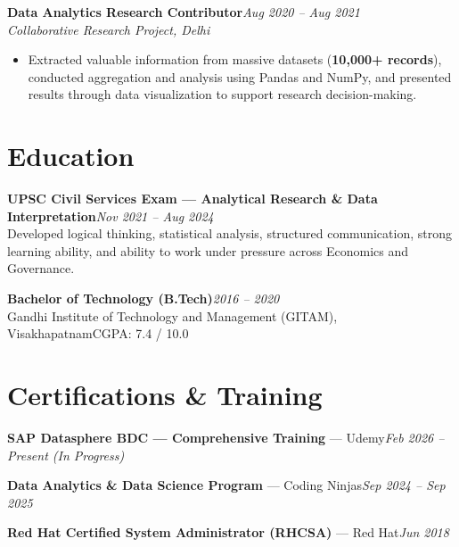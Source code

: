 \documentclass[10pt, letterpaper]{article}
\newcommand{\role}[3]{%
  \vspace{2pt}%
  {\bfseries #1}\hfill{\small\color{muted}\textit{#3}}\\[-2pt]%
  {\small\color{muted}\textit{#2}}%
}
\begin{document}
\role{Data Analytics Research Contributor}{Collaborative Research Project, Delhi}{Aug 2020 – Aug 2021}

\begin{itemize}
  \item Extracted valuable information from massive datasets (\textbf{10,000+ records}), conducted aggregation and analysis using Pandas and NumPy, and presented results through data visualization to support research decision-making.
\end{itemize}

\section{Education}

{\bfseries UPSC Civil Services Exam — Analytical Research \& Data Interpretation}\hfill{\small\color{muted}\textit{Nov 2021 – Aug 2024}}\\
{\small\color{muted}Developed logical thinking, statistical analysis, structured communication, strong learning ability, and ability to work under pressure across Economics and Governance.}

\vspace{2pt}
{\bfseries Bachelor of Technology (B.Tech)}\hfill{\small\color{muted}\textit{2016 – 2020}}\\
{\small\color{muted}Gandhi Institute of Technology and Management (GITAM), Visakhapatnam\hfill CGPA: 7.4 / 10.0}

\section{Certifications \& Training}

{\bfseries SAP Datasphere BDC — Comprehensive Training} — Udemy\hfill{\small\color{muted}\textit{Feb 2026 – Present \emph{(In Progress)}}}

\vspace{1pt}
{\bfseries Data Analytics \& Data Science Program} — Coding Ninjas\hfill{\small\color{muted}\textit{Sep 2024 – Sep 2025}}

\vspace{1pt}
{\bfseries Red Hat Certified System Administrator (RHCSA)} — Red Hat\hfill{\small\color{muted}\textit{Jun 2018}}

\end{document}
